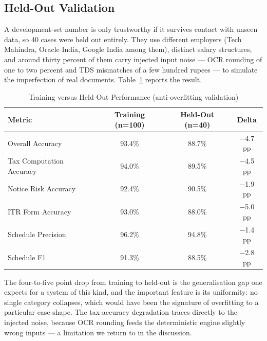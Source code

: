\subsection{Held-Out Validation}
A development-set number is only trustworthy if it survives contact with unseen
data, so 40 cases were held out entirely. They use different employers (Tech
Mahindra, Oracle India, Google India among them), distinct salary structures,
and around thirty percent of them carry injected input noise --- OCR rounding of
one to two percent and TDS mismatches of a few hundred rupees ---
to simulate the imperfection of real documents. Table~\ref{tab:heldout}
reports the result.

\begin{table}[H]
\centering
\caption{Training versus Held-Out Performance (anti-overfitting validation)}
\label{tab:heldout}
\small
\begin{tabularx}{\textwidth}{|X|c|c|c|}
\hline
\textbf{Metric} & \textbf{Training (n=100)} & \textbf{Held-Out (n=40)} & \textbf{Delta} \\
\hline
Overall Accuracy & 93.4\% & 88.7\% & $-$4.7 pp \\
\hline
Tax Computation Accuracy & 94.0\% & 89.5\% & $-$4.5 pp \\
\hline
Notice Risk Accuracy & 92.4\% & 90.5\% & $-$1.9 pp \\
\hline
ITR Form Accuracy & 93.0\% & 88.0\% & $-$5.0 pp \\
\hline
Schedule Precision & 96.2\% & 94.8\% & $-$1.4 pp \\
\hline
Schedule F1 & 91.3\% & 88.5\% & $-$2.8 pp \\
\hline
\end{tabularx}
\end{table}

The four-to-five point drop from training to held-out is the generalisation gap
one expects for a system of this kind, and the important feature is its
uniformity: no single category collapses, which would have been the signature of
overfitting to a particular case shape. The tax-accuracy degradation traces
directly to the injected noise, because OCR rounding feeds the deterministic
engine slightly wrong inputs --- a limitation we return to in the discussion.

